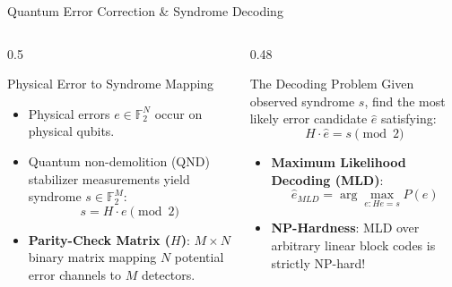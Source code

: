\begin{frame}{Quantum Error Correction \& Syndrome Decoding}
    \begin{columns}[T]
        \begin{column}{0.5\textwidth}
            \begin{block}{Physical Error to Syndrome Mapping}
                \begin{itemize}
                    \item Physical errors $e \in \mathbb{F}_2^N$ occur on physical qubits.
                    \item Quantum non-demolition (QND) stabilizer measurements yield syndrome $s \in \mathbb{F}_2^M$:
                          $$s = H \cdot e \pmod 2$$
                    \item \textbf{Parity-Check Matrix ($H$)}: $M \times N$ binary matrix mapping $N$ potential error channels to $M$ detectors.
                \end{itemize}
            \end{block}
        \end{column}
        
        \begin{column}{0.48\textwidth}
            \begin{block}{The Decoding Problem}
                Given observed syndrome $s$, find the most likely error candidate $\hat{e}$ satisfying:
                $$H \cdot \hat{e} = s \pmod 2$$
                \begin{itemize}
                    \item \textbf{Maximum Likelihood Decoding (MLD)}:
                          $$\hat{e}_{MLD} = \arg\max_{e: He=s} P(e)$$
                    \item \textbf{NP-Hardness}: MLD over arbitrary linear block codes is strictly NP-hard!
                \end{itemize}
            \end{block}
        \end{column}
    \end{columns}
\end{frame}

